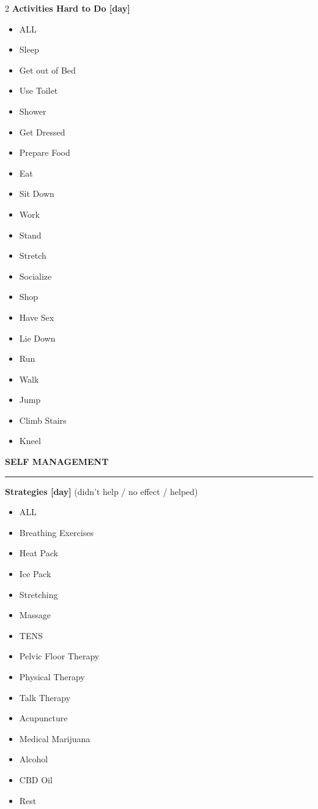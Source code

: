 \begin{multicols}{2}
  \textbf{Activities Hard to Do [day]}
  \begin{itemize}
    \item ALL
    \item Sleep
    \item Get out of Bed
    \item Use Toilet
    \item Shower
    \item Get Dressed
    \item Prepare Food
    \item Eat
    \item Sit Down
    \item Work
    \item Stand
    \item Stretch
    \item Socialize
    \item Shop
    \item Have Sex
    \item Lie Down
    \item Run
    \item Walk
    \item Jump
    \item Climb Stairs
    \item Kneel
  \end{itemize}

  \vspace{1em}

  \textbf{\uppercase{Self Management}}

  \vspace{0.125em}
  \noindent\rule{\columnwidth}{0.25pt}
  \vspace{0.0625em}

  \textbf{Strategies [day]} (didn't help / no effect / helped)
  \begin{itemize}
    \item ALL
    \item Breathing Exercises
    \item Heat Pack
    \item Ice Pack
    \item Stretching
    \item Massage
    \item TENS
    \item Pelvic Floor Therapy
    \item Physical Therapy
    \item Talk Therapy
    \item Acupuncture
    \item Medical Marijuana
    \item Alcohol
    \item CBD Oil
    \item Rest
  \end{itemize}


\end{multicols}
